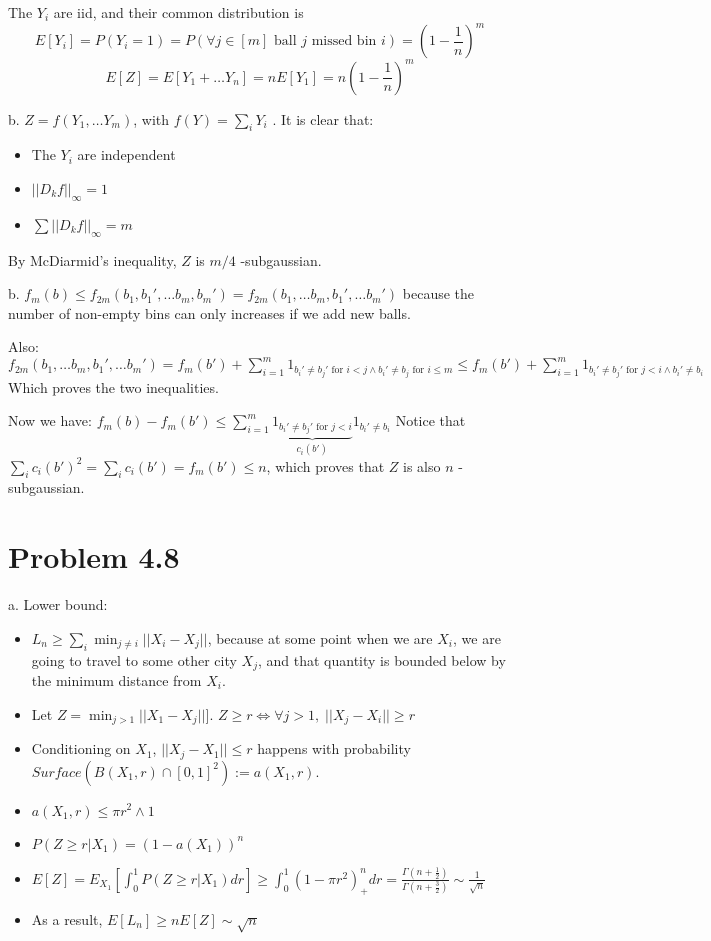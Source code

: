 \documentclass[11pt]{article}
\begin{document}
The \(Y_i\) are iid, and their common distribution is  $$E[Y_i] = P(Y_i = 1) = P(\forall j \in [m] \text{ ball $j$ missed bin $i$}) = (1-\frac 1n)^m$$
$$E[Z] = E[Y_1 + \ldots Y_n] = nE[Y_1] = n(1-\frac1n)^m$$

b. \(Z = f(Y_1, \ldots Y_m)\), with \(f(Y) = \sum_i Y_i\) . It is clear that:
\begin{itemize}
\item The \(Y_i\) are independent
\item \(||D_kf||_{\infty} = 1\)
\item \(\sum ||D_k f||_{\infty} = m\)
\end{itemize}


By McDiarmid's inequality, \(Z\) is \(m/4\) -subgaussian.

b.
\(f_m(b) \le f_{2m}(b_1, b_1', \ldots b_m, b_m') = f_{2m}(b_1, \ldots b_m, b_1', \ldots  b_m')\) because the number of non-empty bins can only increases if we add new balls.

Also:
\(f_{2m}(b_1, \ldots b_m, b_1', \ldots  b_m') = f_m(b') + \sum_{i=1}^m 1_{b_i' \ne b_j' \text{ for } i<j \wedge b_i' \ne b_j \text{ for } i\le m} \le f_m(b') + \sum_{i=1}^m 1_{b_i' \ne b_j' \text{ for } j<i \wedge b_i' \ne b_i}\)
Which proves the two inequalities.

Now we have:
\(f_m(b) - f_m(b') \le \sum_{i=1}^m \underbrace{1_{b_i' \ne b_j' \text{ for } j < i}}_{c_i(b')} 1_{ b_i' \ne b_i}\)
Notice that 
\(\sum_i c_i(b')^2 =  \sum_i c_i(b') = f_m(b') \le n\), which proves that \(Z\) is also \(n\) -subgaussian.


\section{Problem 4.8}
\label{sec:orgheadline6}
a.
Lower bound:
\begin{itemize}
\item \(L_n \ge \sum_i \min_{j \ne i} ||X_i - X_j||\), because at some point when we are \(X_i\), we are going to travel to some other city \(X_j\), and that quantity is bounded below by the minimum distance from \(X_i\).
\item Let \(Z = \min_{j > 1} ||X_1 - X_j||]\). \(Z \ge r \iff \forall j > 1, \; ||X_j - X_i|| \ge r\)
\item Conditioning on \(X_1\),  \(||X_j - X_1|| \le r\) happens with probability \(Surface(B(X_1, r) \cap [0, 1]^2) := a(X_1, r)\).
\item \(a(X_1, r) \le \pi r^2 \wedge 1\)
\item \(P(Z \ge r | X_1) = (1-a(X_1))^n\)
\item \(E[Z] = E_{X_1}[\int_0^1 P(Z \ge r | X_1) dr] \ge  \int_0^1 (1-\pi r^2)_+^n dr = \frac{\Gamma(n+\frac12)}{\Gamma(n+\frac32)} \sim \frac1{\sqrt n}\)
\item As a result, \(E[L_n] \ge n E[Z] \sim \sqrt{n}\)
\end{itemize}
\end{document}
